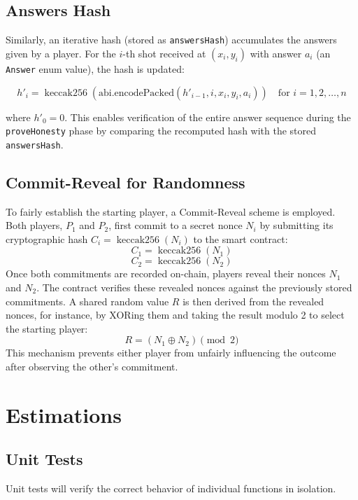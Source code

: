 \documentclass{article}
\begin{document}
    \subsection{Answers Hash}

    Similarly, an iterative hash (stored as \texttt{answersHash}) accumulates the answers given by a player. For the \( i \)-th shot received at \( (x_i, y_i) \) with answer \( a_i \) (an \texttt{Answer} enum value), the hash is updated:

    \[ h'_i = \operatorname{keccak256}(\text{abi.encodePacked}(h'_{i-1}, i, x_i, y_i, a_i)) \quad \text{for } i = 1, 2, \ldots, n \]

    where \( h'_0 = 0 \). This enables verification of the entire answer sequence during the \texttt{proveHonesty} phase by comparing the recomputed hash with the stored \texttt{answersHash}.

    \subsection{Commit-Reveal for Randomness}

    To fairly establish the starting player, a Commit-Reveal scheme is employed. Both players, \(P_1\) and \(P_2\), first commit to a secret nonce \(N_i\) by submitting its cryptographic hash \(C_i = \operatorname{keccak256}(N_i)\) to the smart contract:
    \[C_1 = \operatorname{keccak256}(N_1)\]
    \[C_2 = \operatorname{keccak256}(N_2)\]
    Once both commitments are recorded on-chain, players reveal their nonces \(N_1\) and \(N_2\). The contract verifies these revealed nonces against the previously stored commitments. A shared random value \(R\) is then derived from the revealed nonces, for instance, by XORing them and taking the result modulo 2 to select the starting player:
    \[R = (N_1 \oplus N_2) \pmod 2\]
    This mechanism prevents either player from unfairly influencing the outcome after observing the other's commitment.

    \section{Estimations}
    
    \subsection{Unit Tests}
    Unit tests will verify the correct behavior of individual functions in isolation.
\end{document}
